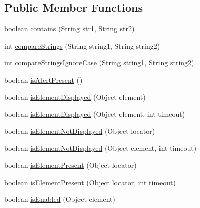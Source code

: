 \subsection*{Public Member Functions}
\begin{DoxyCompactItemize}
\item 
boolean \hyperlink{interfacecom_1_1zeuslearning_1_1automation_1_1interactions_1_1IVerifications_aa130fde03f220efd0733c6481afa9b94}{contains} (String str1, String str2)
\item 
int \hyperlink{interfacecom_1_1zeuslearning_1_1automation_1_1interactions_1_1IVerifications_ace567c4e2269a32d10805e3269679713}{compare\+Strings} (String string1, String string2)
\item 
int \hyperlink{interfacecom_1_1zeuslearning_1_1automation_1_1interactions_1_1IVerifications_a8dbd85a25febbd6a7f5e3b1bf186e0f1}{compare\+Strings\+Ignore\+Case} (String string1, String string2)
\item 
boolean \hyperlink{interfacecom_1_1zeuslearning_1_1automation_1_1interactions_1_1IVerifications_aec38d25880abb184e78864f6ac03a4e8}{is\+Alert\+Present} ()
\item 
boolean \hyperlink{interfacecom_1_1zeuslearning_1_1automation_1_1interactions_1_1IVerifications_a058cc25b997507a15fe6e76ba401d54d}{is\+Element\+Displayed} (Object element)
\item 
boolean \hyperlink{interfacecom_1_1zeuslearning_1_1automation_1_1interactions_1_1IVerifications_a047cd4a4c2d0096b993b0e45c885e79d}{is\+Element\+Displayed} (Object element, int timeout)
\item 
boolean \hyperlink{interfacecom_1_1zeuslearning_1_1automation_1_1interactions_1_1IVerifications_aac95057ff56c12e2a3929b60a585fdcb}{is\+Element\+Not\+Displayed} (Object locator)
\item 
boolean \hyperlink{interfacecom_1_1zeuslearning_1_1automation_1_1interactions_1_1IVerifications_ae316099347aefe61a68670c2f5fedaea}{is\+Element\+Not\+Displayed} (Object element, int timeout)
\item 
boolean \hyperlink{interfacecom_1_1zeuslearning_1_1automation_1_1interactions_1_1IVerifications_abc5aef72ba806e5033b1c815799dfd80}{is\+Element\+Present} (Object locator)
\item 
boolean \hyperlink{interfacecom_1_1zeuslearning_1_1automation_1_1interactions_1_1IVerifications_aacc6eef44a30e8e8e228229c31949a9c}{is\+Element\+Present} (Object locator, int timeout)
\item 
boolean \hyperlink{interfacecom_1_1zeuslearning_1_1automation_1_1interactions_1_1IVerifications_aa53fca4dbb7f948ef751ac7ebea69f9a}{is\+Enabled} (Object element)

\end{DoxyCompactItemize}
